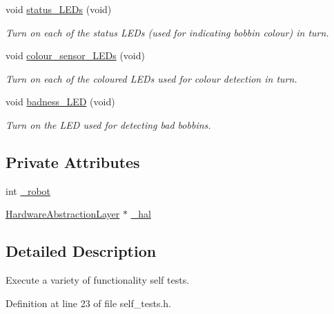 \begin{DoxyCompactItemize}
void \hyperlink{classIDP_1_1SelfTests_abbe6e3e29b00f760e0b65f2aeb772fb5}{status\_\-LEDs} (void)
\begin{DoxyCompactList}\small\item\em Turn on each of the status LEDs (used for indicating bobbin colour) in turn. \item\end{DoxyCompactList}\item 
void \hyperlink{classIDP_1_1SelfTests_a1380b0222eef47f6d50e7cf334e4c9e7}{colour\_\-sensor\_\-LEDs} (void)
\begin{DoxyCompactList}\small\item\em Turn on each of the coloured LEDs used for colour detection in turn. \item\end{DoxyCompactList}\item 
void \hyperlink{classIDP_1_1SelfTests_aee90c71e9e93398f06dc1ad67002d7bf}{badness\_\-LED} (void)
\begin{DoxyCompactList}\small\item\em Turn on the LED used for detecting bad bobbins. \item\end{DoxyCompactList}\end{DoxyCompactItemize}
\subsection*{Private Attributes}
\begin{DoxyCompactItemize}
\item 
int \hyperlink{classIDP_1_1SelfTests_a90c60ce647f723e9a37339aadba4770c}{\_\-robot}
\item 
\hyperlink{classIDP_1_1HardwareAbstractionLayer}{HardwareAbstractionLayer} $\ast$ \hyperlink{classIDP_1_1SelfTests_a1f8a6f6c2ff26182311c8a7766db6f5a}{\_\-hal}
\end{DoxyCompactItemize}


\subsection{Detailed Description}
Execute a variety of functionality self tests. 

Definition at line 23 of file self\_\-tests.h.



